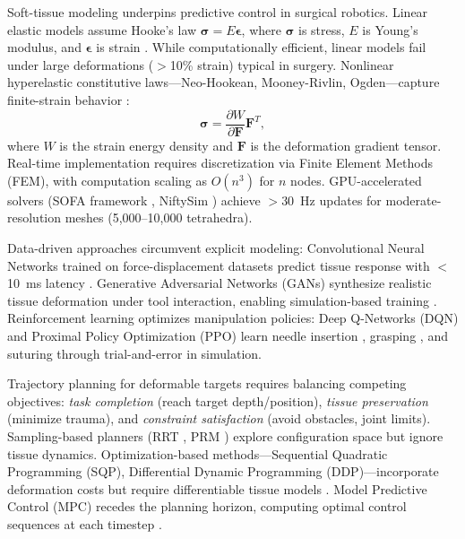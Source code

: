 \documentclass[journal]{IEEEtran}
\begin{document}
Soft-tissue modeling underpins predictive control in surgical robotics. Linear elastic models assume Hooke's law $\boldsymbol{\sigma} = E \boldsymbol{\epsilon}$, where $\boldsymbol{\sigma}$ is stress, $E$ is Young's modulus, and $\boldsymbol{\epsilon}$ is strain \cite{misra2010modeling}. While computationally efficient, linear models fail under large deformations ($>$10\% strain) typical in surgery. Nonlinear hyperelastic constitutive laws---Neo-Hookean, Mooney-Rivlin, Ogden---capture finite-strain behavior \cite{holzapfel2000nonlinear}:
\begin{equation}
\boldsymbol{\sigma} = \frac{\partial W}{\partial \mathbf{F}} \mathbf{F}^T,
\end{equation}
where $W$ is the strain energy density and $\mathbf{F}$ is the deformation gradient tensor. Real-time implementation requires discretization via Finite Element Methods (FEM), with computation scaling as $O(n^3)$ for $n$ nodes. GPU-accelerated solvers (SOFA framework \cite{allard2007sofa}, NiftySim \cite{taylor2008niftysim}) achieve $>$30~Hz updates for moderate-resolution meshes (5,000--10,000 tetrahedra).

Data-driven approaches circumvent explicit modeling: Convolutional Neural Networks trained on force-displacement datasets predict tissue response with $<$10~ms latency \cite{pfeiffer2019perception}. Generative Adversarial Networks (GANs) synthesize realistic tissue deformation under tool interaction, enabling simulation-based training \cite{hong2018learning}. Reinforcement learning optimizes manipulation policies: Deep Q-Networks (DQN) \cite{mnih2015human} and Proximal Policy Optimization (PPO) \cite{schulman2017proximal} learn needle insertion \cite{tang2021reinforcement}, grasping \cite{mahler2017dex}, and suturing \cite{thananjeyan2021recovery} through trial-and-error in simulation.

Trajectory planning for deformable targets requires balancing competing objectives: \textit{task completion} (reach target depth/position), \textit{tissue preservation} (minimize trauma), and \textit{constraint satisfaction} (avoid obstacles, joint limits). Sampling-based planners (RRT \cite{lavalle1998rapidly}, PRM \cite{kavraki1996probabilistic}) explore configuration space but ignore tissue dynamics. Optimization-based methods---Sequential Quadratic Programming (SQP), Differential Dynamic Programming (DDP)---incorporate deformation costs but require differentiable tissue models \cite{schulman2013finding}. Model Predictive Control (MPC) recedes the planning horizon, computing optimal control sequences at each timestep \cite{quiroz2018model}.
\end{document}

